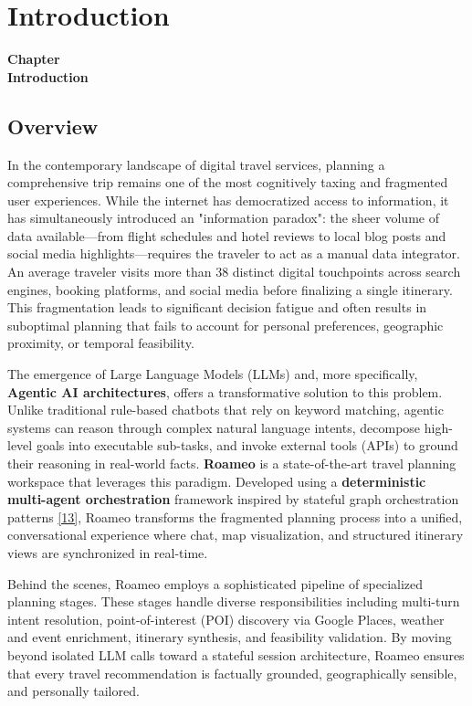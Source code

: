 \documentclass[12pt,a4paper]{report}
\newcommand{\chapcite}[1]{\hyperlink{ref:#1}{[#1]}}
\newcommand{\chapcitetarget}[1]{\hypertarget{cite:#1}{}\chapcite{#1}}
\newcommand{\chaptercontentheading}[1]{%
  \thispagestyle{mainstyle}%
  \begin{center}
    {\Large\bfseries Chapter~\thechapter}\\[0.35cm]
    {\Large\bfseries #1}
  \end{center}
  \vspace{0.9cm}
}
\begin{document}
\chapter{Introduction}
\chaptercontentheading{Introduction}

\section{Overview}

In the contemporary landscape of digital travel services, planning a comprehensive trip remains one of the most cognitively taxing and fragmented user experiences. While the internet has democratized access to information, it has simultaneously introduced an "information paradox": the sheer volume of data available---from flight schedules and hotel reviews to local blog posts and social media highlights---requires the traveler to act as a manual data integrator. An average traveler visits more than 38 distinct digital touchpoints across search engines, booking platforms, and social media before finalizing a single itinerary. This fragmentation leads to significant decision fatigue and often results in suboptimal planning that fails to account for personal preferences, geographic proximity, or temporal feasibility.

The emergence of Large Language Models (LLMs) and, more specifically, \textbf{Agentic AI architectures}, offers a transformative solution to this problem. Unlike traditional rule-based chatbots that rely on keyword matching, agentic systems can reason through complex natural language intents, decompose high-level goals into executable sub-tasks, and invoke external tools (APIs) to ground their reasoning in real-world facts. \textbf{Roameo} is a state-of-the-art travel planning workspace that leverages this paradigm. Developed using a \textbf{deterministic multi-agent orchestration} framework inspired by stateful graph orchestration patterns \chapcitetarget{13}, Roameo transforms the fragmented planning process into a unified, conversational experience where chat, map visualization, and structured itinerary views are synchronized in real-time.

Behind the scenes, Roameo employs a sophisticated pipeline of specialized planning stages. These stages handle diverse responsibilities including multi-turn intent resolution, point-of-interest (POI) discovery via Google Places, weather and event enrichment, itinerary synthesis, and feasibility validation. By moving beyond isolated LLM calls toward a stateful session architecture, Roameo ensures that every travel recommendation is factually grounded, geographically sensible, and personally tailored.
\end{document}
